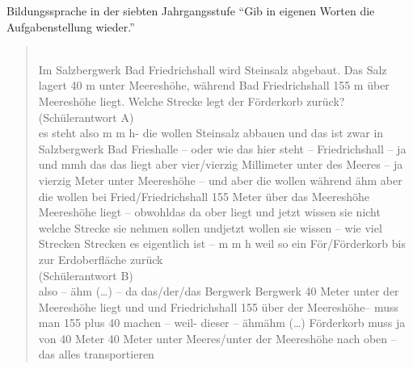 \begin{frame}
  {Bildungssprache in der siebten Jahrgangsstufe}
  \onslide<+->
  \onslide<+->
  \alert{"`Gib in eigenen Worten die Aufgabenstellung wieder."'} \\
  \Halbzeile
  \onslide<+->
  \begin{quote}\footnotesize
    \\
    Im Salzbergwerk Bad Friedrichshall wird Steinsalz abgebaut. Das Salz lagert 40 m unter Meereshöhe, während Bad Friedrichshall 155 m über Meereshöhe liegt. Welche Strecke legt der Förderkorb zurück? \\
    \Halbzeile
    \onslide<+->
    \alert{(Schülerantwort A)}\\
    es steht also m m h- die wollen Steinsalz abbauen und das ist zwar in Salzbergwerk Bad Frieshalle -- oder wie das hier steht -- Friedrichshall -- ja und mmh das das liegt aber vier\slash vierzig Millimeter unter des Meeres -- ja vierzig Meter unter Meereshöhe -- und aber die wollen während ähm aber die wollen bei Fried\slash Friedrichshall 155 Meter über das Meereshöhe Meereshöhe liegt -- obwohldas da ober liegt und jetzt wissen sie nicht welche Strecke sie nehmen sollen undjetzt wollen sie wissen -- wie viel Strecken Strecken es eigentlich ist -- m m h weil so ein För\slash Förderkorb bis zur Erdoberfläche zurück\\
    \Halbzeile
    \onslide<+->
    \alert{(Schülerantwort B)}\\
    also -- ähm (\ldots) -- da das\slash der\slash das Bergwerk Bergwerk 40 Meter unter der Meereshöhe liegt und und Friedrichshall 155 über der Meereshöhe--  muss man 155 plus 40 machen -- weil- dieser -- ähmähm (\ldots) Förderkorb muss ja von 40 Meter 40 Meter unter Meeres\slash unter der Meereshöhe nach oben -- das alles transportieren
  \end{quote}
\end{frame}

